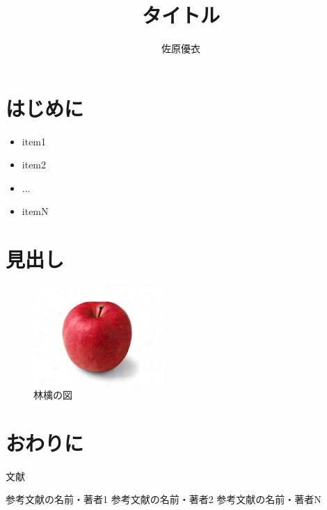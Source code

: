 \documentclass[twocolumn,a4paper]{jsarticle}
\title{タイトル}
\author{佐原優衣}
\date{}
\begin{document}
\maketitle

\section{はじめに}

\begin{itemize}
  \item item1
  \item item2
  \item ...
  \item itemN
\end{itemize}

\section{見出し}

\begin{figure}
  \centering
  \includegraphics[width=5cm]{apple.jpg}
  \caption{林檎の図}
  \label{app}
\end{figure}

\section{おわりに}
文献\cite{key1}

\begin{thebibliography}{3}
   参考文献の名前・著者1
   参考文献の名前・著者2
   参考文献の名前・著者N
\end{thebibliography}
\end{document}

